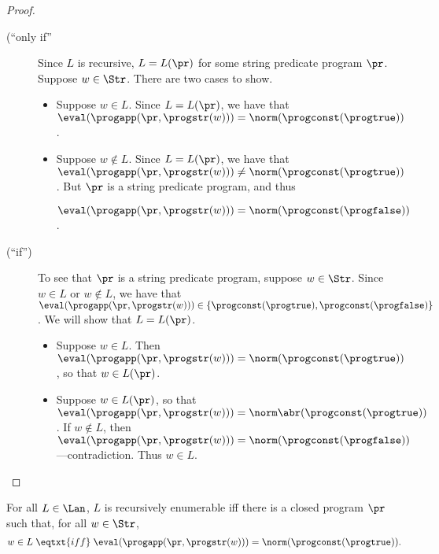 \begin{proof}
\begin{description}
\item[\quad(``only if'']
  Since $L$ is recursive, $L=L(\pr)$ for some
  string predicate program $\pr$.  Suppose $w\in\Str$.  There are two
  cases to show.
  \begin{itemize}
  \item Suppose $w\in L$.  Since $L=L(\pr)$, we have that
    $\eval(\progapp(\pr,\progstr(w)))=\norm(\progconst(\progtrue))$.

  \item Suppose $w\not\in L$.  Since $L=L(\pr)$, we have that
    $\eval(\progapp(\pr,\progstr(w)))\neq\norm(\progconst(\progtrue))$.
    But $\pr$ is a string predicate program, and thus

    $\eval(\progapp(\pr,\progstr(w)))=\norm(\progconst(\progfalse))$.
  \end{itemize}

\item[\quad(``if'')] To see that $\pr$ is a string predicate program,
  suppose $w\in\Str$.  Since $w\in L$ or $w\not\in L$, we have that
  $\eval(\progapp(\pr,\progstr(w)))\in
  \{\progconst(\progtrue),\progconst(\progfalse)\}$.  We will show that
  $L=L(\pr)$.
  \begin{itemize}
  \item Suppose $w\in L$.  Then $\eval(\progapp(\pr,\progstr(w)))=
    \norm(\progconst(\progtrue))$, so that $w\in L(\pr)$.

  \item Suppose $w\in L(\pr)$, so that
    $\eval(\progapp(\pr,\progstr(w)))= \norm\abr(\progconst(\progtrue))$.  If
    $w\not\in L$, then $\eval(\progapp(\pr,\progstr(w)))=
    \norm(\progconst(\progfalse))$---contradiction.  Thus $w\in L$.
\end{itemize}
\end{description}
\end{proof}

\begin{proposition}
\label{REProp}
For all $L\in\Lan$, $L$ is recursively enumerable iff there is a
closed program $\pr$ such that, for all $w\in\Str$,
\begin{gather*}
w\in L\;\eqtxt{iff}\;\eval(\progapp(\pr,\progstr(w)))=
\norm(\progconst(\progtrue)) .
\end{gather*}
\end{proposition}

